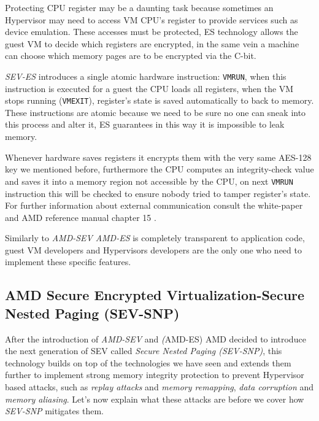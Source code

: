 \documentclass[twocolumn]{article}
\begin{document}
Protecting CPU register may be a daunting task because sometimes an Hypervisor may need to access VM CPU's register to provide services such as device emulation. These accesses must be protected, ES technology allows the guest VM to decide which registers are encrypted, in the same vein a machine can choose which memory pages are to be encrypted via the C-bit.

\textit{SEV-ES} introduces a single atomic hardware instruction: \texttt{VMRUN}, when this instruction is executed for a guest the CPU loads all registers, when the VM stops running (\texttt{VMEXIT}), register's state is saved automatically to  back to memory. These instructions are atomic because we need to be sure no one can sneak into this process and alter it, ES guarantees in this way it is impossible to leak memory.

Whenever hardware saves registers it encrypts them with the very same AES-128 key we mentioned before, furthermore the CPU computes an integrity-check value and saves it into a memory region not accessible by the CPU, on next \texttt{VMRUN} instruction this will be checked to ensure nobody tried to tamper register's state. For further information about external communication consult the white-paper \cite{protecting-registers} and AMD reference manual chapter 15 \cite{architecture-reference}.

Similarly to \textit{AMD-SEV} \textit{AMD-ES} is completely transparent to application code, guest VM developers and Hypervisors developers are the only one who  need to implement these specific features.

\subsection{AMD Secure Encrypted Virtualization-Secure Nested Paging (SEV-SNP)}

After the introduction of \textit{AMD-SEV} and \textit(AMD-ES) AMD decided to introduce the next generation of SEV called \textit{Secure Nested Paging (SEV-SNP)}, this technology builds on top of the technologies we have seen and extends them further to implement strong memory integrity protection to prevent Hypervisor based attacks, such as \textit{replay attacks} and \textit{memory remapping}, \textit{data corruption} and \textit{memory aliasing}.
Let's now explain what these attacks are before we cover how \textit{SEV-SNP} mitigates them.
\end{document}
